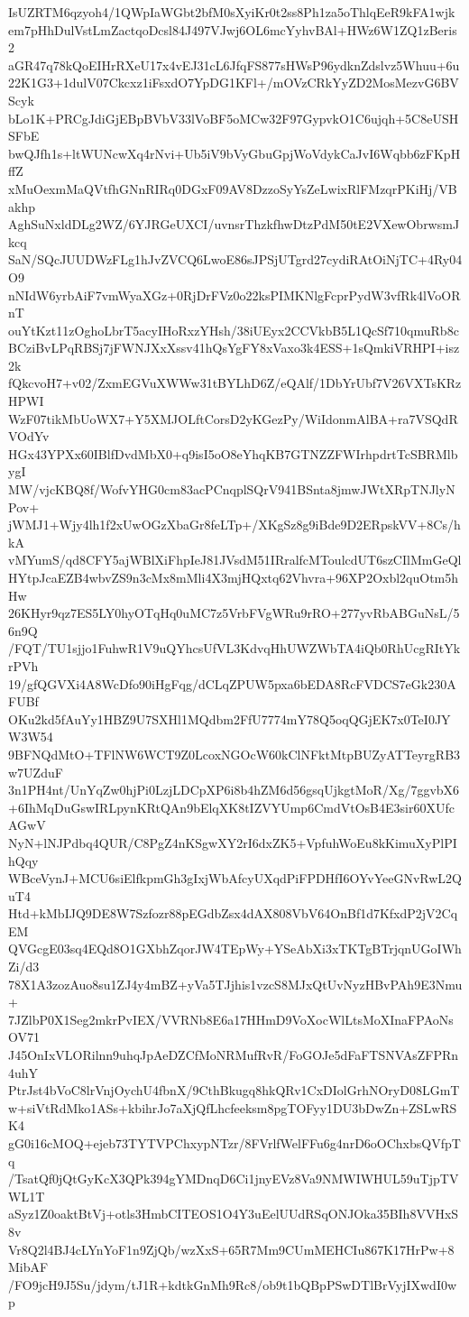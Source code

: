 IsUZRTM6qzyoh4/1QWpIaWGbt2bfM0sXyiKr0t2ss8Ph1za5oThlqEeR9kFA1wjk
em7pHhDulVstLmZactqoDcsl84J497VJwj6OL6mcYyhvBAl+HWz6W1ZQ1zBeris2
aGR47q78kQoEIHrRXeU17x4vEJ31cL6JfqFS877sHWsP96ydknZdslvz5Whuu+6u
22K1G3+1dulV07Ckcxz1iFsxdO7YpDG1KFl+/mOVzCRkYyZD2MosMezvG6BVScyk
bLo1K+PRCgJdiGjEBpBVbV33lVoBF5oMCw32F97GypvkO1C6ujqh+5C8eUSHSFbE
bwQJfh1s+ltWUNcwXq4rNvi+Ub5iV9bVyGbuGpjWoVdykCaJvI6Wqbb6zFKpHffZ
xMuOexmMaQVtfhGNnRIRq0DGxF09AV8DzzoSyYsZeLwixRlFMzqrPKiHj/VBakhp
AghSuNxldDLg2WZ/6YJRGeUXCI/uvnsrThzkfhwDtzPdM50tE2VXewObrwsmJkcq
SaN/SQcJUUDWzFLg1hJvZVCQ6LwoE86sJPSjUTgrd27cydiRAtOiNjTC+4Ry04O9
nNIdW6yrbAiF7vmWyaXGz+0RjDrFVz0o22ksPIMKNlgFcprPydW3vfRk4lVoORnT
ouYtKzt11zOghoLbrT5acyIHoRxzYHsh/38iUEyx2CCVkbB5L1QcSf710qmuRb8c
BCziBvLPqRBSj7jFWNJXxXssv41hQsYgFY8xVaxo3k4ESS+1sQmkiVRHPI+isz2k
fQkcvoH7+v02/ZxmEGVuXWWw31tBYLhD6Z/eQAlf/1DbYrUbf7V26VXTsKRzHPWI
WzF07tikMbUoWX7+Y5XMJOLftCorsD2yKGezPy/WiIdonmAlBA+ra7VSQdRVOdYv
HGx43YPXx60IBlfDvdMbX0+q9isI5oO8eYhqKB7GTNZZFWIrhpdrtTcSBRMlbygI
MW/vjcKBQ8f/WofvYHG0cm83acPCnqplSQrV941BSnta8jmwJWtXRpTNJlyNPov+
jWMJ1+Wjy4lh1f2xUwOGzXbaGr8feLTp+/XKgSz8g9iBde9D2ERpskVV+8Cs/hkA
vMYumS/qd8CFY5ajWBlXiFhpIeJ81JVsdM51IRralfcMToulcdUT6szCIlMmGeQl
HYtpJcaEZB4wbvZS9n3cMx8mMli4X3mjHQxtq62Vhvra+96XP2Oxbl2quOtm5hHw
26KHyr9qz7ES5LY0hyOTqHq0uMC7z5VrbFVgWRu9rRO+277yvRbABGuNsL/56n9Q
/FQT/TU1sjjo1FuhwR1V9uQYhcsUfVL3KdvqHhUWZWbTA4iQb0RhUcgRItYkrPVh
19/gfQGVXi4A8WcDfo90iHgFqg/dCLqZPUW5pxa6bEDA8RcFVDCS7eGk230AFUBf
OKu2kd5fAuYy1HBZ9U7SXHl1MQdbm2FfU7774mY78Q5oqQGjEK7x0TeI0JYW3W54
9BFNQdMtO+TFlNW6WCT9Z0LcoxNGOcW60kClNFktMtpBUZyATTeyrgRB3w7UZduF
3n1PH4nt/UnYqZw0hjPi0LzjLDCpXP6i8b4hZM6d56gsqUjkgtMoR/Xg/7ggvbX6
+6IhMqDuGswIRLpynKRtQAn9bElqXK8tIZVYUmp6CmdVtOsB4E3sir60XUfcAGwV
NyN+lNJPdbq4QUR/C8PgZ4nKSgwXY2rI6dxZK5+VpfuhWoEu8kKimuXyPlPIhQqy
WBceVynJ+MCU6siElfkpmGh3gIxjWbAfcyUXqdPiFPDHfI6OYvYeeGNvRwL2QuT4
Htd+kMbIJQ9DE8W7Szfozr88pEGdbZsx4dAX808VbV64OnBf1d7KfxdP2jV2CqEM
QVGcgE03sq4EQd8O1GXbhZqorJW4TEpWy+YSeAbXi3xTKTgBTrjqnUGoIWhZi/d3
78X1A3zozAuo8su1ZJ4y4mBZ+yVa5TJjhis1vzcS8MJxQtUvNyzHBvPAh9E3Nmu+
7JZlbP0X1Seg2mkrPvIEX/VVRNb8E6a17HHmD9VoXocWlLtsMoXInaFPAoNsOV71
J45OnIxVLORilnn9uhqJpAeDZCfMoNRMufRvR/FoGOJe5dFaFTSNVAsZFPRn4uhY
PtrJst4bVoC8lrVnjOychU4fbnX/9CthBkugq8hkQRv1CxDIolGrhNOryD08LGmT
w+siVtRdMko1ASs+kbihrJo7aXjQfLhcfeeksm8pgTOFyy1DU3bDwZn+ZSLwRSK4
gG0i16cMOQ+ejeb73TYTVPChxypNTzr/8FVrlfWelFFu6g4nrD6oOChxbsQVfpTq
/TsatQf0jQtGyKcX3QPk394gYMDnqD6Ci1jnyEVz8Va9NMWIWHUL59uTjpTVWL1T
aSyz1Z0oaktBtVj+otls3HmbCITEOS1O4Y3uEelUUdRSqONJOka35BIh8VVHxS8v
Vr8Q2l4BJ4cLYnYoF1n9ZjQb/wzXxS+65R7Mm9CUmMEHCIu867K17HrPw+8MibAF
/FO9jcH9J5Su/jdym/tJ1R+kdtkGnMh9Rc8/ob9t1bQBpPSwDTlBrVyjIXwdI0wp
